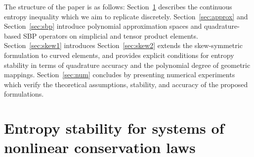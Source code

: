 \documentclass{svjour3}                     %
\renewcommand{\note}[1]{{\color{blue}{#1}}}
\begin{document}
The structure of the paper is as follows: Section~\ref{sec:nonlin} describes the continuous entropy inequality which we aim to replicate discretely.  Section~\ref{sec:approx} and Section~\ref{sec:sbp} introduce polynomial approximation spaces and quadrature-based SBP operators on simplicial and tensor product elements.  
Section~\ref{sec:skew1} introduces \note{an alternative skew-symmetric construction of SBP operators and describes how to construct entropy stable formulations on a reference element.  Connections between the accuracy of the new skew-symmetric SBP operators and quadrature accuracy are also discussed.}  Section~\ref{sec:skew2} extends the skew-symmetric formulation to curved elements, and provides explicit conditions for entropy stability in terms of quadrature accuracy and the polynomial degree of geometric mappings.  Section~\ref{sec:num} concludes by presenting numerical experiments which verify the theoretical assumptions, stability, and accuracy of the proposed formulations.



\section{Entropy stability for systems of nonlinear conservation laws}
\label{sec:nonlin} 
\end{document}
